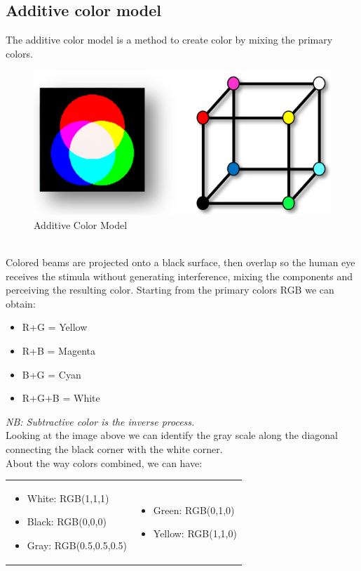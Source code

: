 \subsection{Additive color model}
The additive color model is a method to create color by mixing the primary colors.
\begin{figure}[h]
    \centering
    \includegraphics[scale=0.5]{Figures/AdditiveModel.png}
    \caption{Additive Color Model}
    \label{fig:enter-label}
\end{figure}
\\
Colored beams are projected onto a black surface, then overlap so the human eye receives the stimula without generating interference, mixing the components and perceiving the resulting color.
Starting from the primary colors RGB we can obtain:
\begin{multicols}{2}
    \begin{itemize}
        \item R+G = Yellow
        \item R+B = Magenta
    \end{itemize} 
    \columnbreak
    \begin{itemize}
        \item B+G = Cyan
        \item R+G+B = White
    \end{itemize}
\end{multicols}
\textit{NB: Subtractive color is the inverse process.}\\
Looking at the image above we can identify the gray scale along the diagonal connecting the black corner with the white corner.
\\
About the way colors combined, we can have:\\
\begin{tabular}{p{} p{}}
    \begin{itemize}
        \item White: RGB(1,1,1)
        \item Black: RGB(0,0,0)
        \item Gray: RGB(0.5,0.5,0.5)
    \end{itemize}
    &
    \begin{itemize}
        \item Green: RGB(0,1,0)
        \item Yellow: RGB(1,1,0)
    \end{itemize}
\end{tabular}
